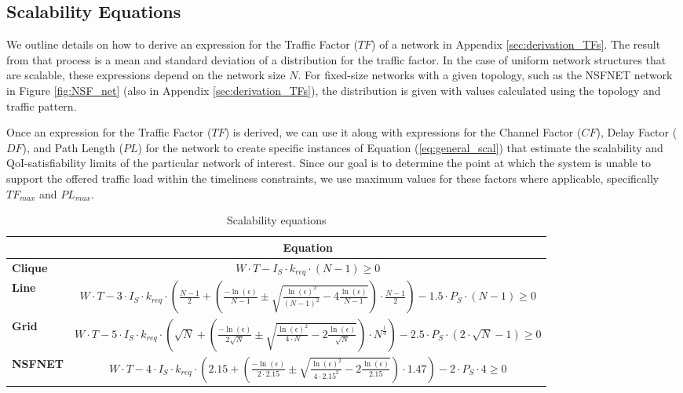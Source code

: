 \subsection{Scalability Equations}

We outline details on how to derive an expression for the Traffic Factor ($TF$) of a network in Appendix \ref{sec:derivation_TFs}. The result from that process is a mean and standard deviation of a distribution for the traffic factor. In the case of uniform network structures that are scalable, these expressions depend on the network size $N$. For fixed-size networks with a given topology, such as the NSFNET network in Figure \ref{fig:NSF_net} (also in Appendix \ref{sec:derivation_TFs}), the distribution is given with values calculated using the topology and traffic pattern. 

Once an expression for the Traffic Factor ($TF$) is derived, we can use it along with expressions for the Channel Factor ($CF$), Delay Factor ($DF$), and Path Length ($PL$) for the network to create specific instances of Equation (\ref{eq:general_scal}) that estimate the scalability and QoI-satisfiability limits of the particular network of interest.  Since our goal is to determine the point at which the system is unable to support the offered traffic load within the timeliness constraints, we use maximum values for these factors where applicable, specifically $TF_{max}$ and $PL_{max}$. 

\begin{table}[]
\centering
\begin{tabular}{l|l|}
\cline{2-2}
                             & \multicolumn{1}{c|}{{\bf Equation}} \\ \hline
\multicolumn{1}{|l|}{\textbf{Clique}} & \multicolumn{1}{c|}{$W \cdot T - I_S \cdot k_{req} \cdot (N-1) \geq 0$}            \\ \hline
\multicolumn{1}{|l|}{\textbf{Line}}   & \multicolumn{1}{c|}{$W \cdot T - 3 \cdot I_S \cdot k_{req} \cdot (\frac{N-1}{2} + (\frac{-\ln(\epsilon)}{N-1} \pm \sqrt{\frac{\ln(\epsilon)^2}{(N-1)^2} - 4\frac{\ln(\epsilon)}{N-1}} ) \cdot \frac{N-1}{2}) - 1.5 \cdot P_S \cdot (N-1) \geq 0$}       \\ \hline
\multicolumn{1}{|l|}{\textbf{Grid}}   & \multicolumn{1}{c|}{$W \cdot T - 5 \cdot I_S \cdot k_{req} \cdot ( \sqrt{N} + (\frac{-\ln(\epsilon)}{2\sqrt{N}} \pm \sqrt{\frac{\ln(\epsilon)^2}{4 \cdot N} - 2\frac{\ln(\epsilon)}{\sqrt{N}}} ) \cdot N^{\frac{1}{4}}) - 2.5 \cdot P_S \cdot (2 \cdot \sqrt{N} - 1) \geq 0$}      \\ \hline
\multicolumn{1}{|l|}{\textbf{NSFNET}}   & \multicolumn{1}{c|}{$W \cdot T - 4 \cdot I_S \cdot k_{req} \cdot ( 2.15 + (\frac{-\ln(\epsilon)}{2 \cdot 2.15} \pm \sqrt{\frac{\ln(\epsilon)^2}{4 \cdot 2.15^2} - 2\frac{\ln(\epsilon)}{2.15}} ) \cdot 1.47) - 2 \cdot P_S \cdot 4 \geq 0$}      \\ \hline
\end{tabular}
\vspace{1mm}
\caption{Scalability equations}
\label{table:scal_eqs}
\end{table}

